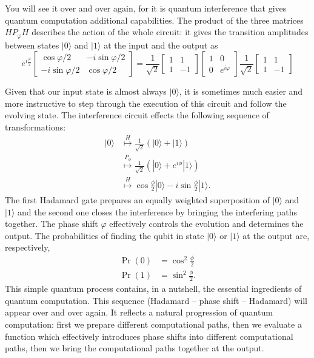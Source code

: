 \documentclass{article}
\renewcommand{\footnote}[1]{\en{#1}}
\begin{document}
You will see it over and over again, for it is quantum interference that gives quantum computation additional capabilities.
The product of the three matrices \(HP_\varphi H\) describes the action of the whole circuit: it gives the transition amplitudes between states \(|0\rangle\) and \(|1\rangle\) at the input and the output as
\[
  e^{i\frac{\varphi}{2}}
  \begin{bmatrix}
    \cos\varphi/2 & -i\sin\varphi/2
  \\-i\sin\varphi/2 & \cos\varphi/2
  \end{bmatrix}
  =
  \frac{1}{\sqrt 2}
  \begin{bmatrix}
    1 & 1
  \\1 & -1
  \end{bmatrix}
  \begin{bmatrix}
    1 & 0
  \\0 & e^{i\varphi}
  \end{bmatrix}
  \frac{1}{\sqrt 2}
  \begin{bmatrix}
    1 & 1
  \\1 & -1
  \end{bmatrix}
\]

Given that our input state is almost always \(|0\rangle\), it is sometimes much easier and more instructive to step through the execution of this circuit and follow the evolving state.
The interference circuit effects the following sequence of transformations:\footnote{We ignore the global phase factor \(e^{i\frac{\varphi}{2}}\).}
\[
  \begin{aligned}
    |0\rangle
    &\overset{H}{\longmapsto}
    \frac{1}{\sqrt2} \left(
      |0\rangle+|1\rangle
    \right)
  \\&\overset{P_\phi}{\longmapsto}
    \frac{1}{\sqrt2} \left(
      |0\rangle+e^{i\phi}|1\rangle
    \right)
  \\&\overset{H}{\longmapsto}
    \cos\frac{\phi}{2}|0\rangle - i\sin\frac{\phi}{2}|1\rangle.
  \end{aligned}
\]
The first Hadamard gate prepares an equally weighted superposition of \(|0\rangle\) and \(|1\rangle\) and the second one closes the interference by bringing the interfering paths together.
The phase shift \(\varphi\) effectively controls the evolution and determines the output.
The probabilities of finding the qubit in state \(|0\rangle\) or \(|1\rangle\) at the output are, respectively,
\[
  \begin{aligned}
    \Pr(0) &= \cos^2\frac{\phi}{2}
  \\\Pr(1) &= \sin^2\frac{\phi}{2}.
  \end{aligned}
\]
This simple quantum process contains, in a nutshell, the essential ingredients of quantum computation.
This sequence (Hadamard -- phase shift -- Hadamard) will appear over and over again.
It reflects a natural progression of quantum computation: first we prepare different computational paths, then we evaluate a function which effectively introduces phase shifts into different computational paths, then we bring the computational paths together at the output.
\end{document}
